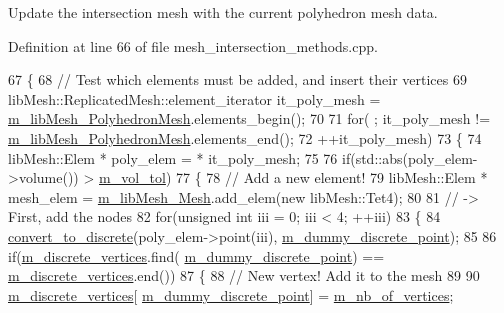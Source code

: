 Update the intersection mesh with the current polyhedron mesh data. 



Definition at line 66 of file mesh\+\_\+intersection\+\_\+methods.\+cpp.


\begin{DoxyCode}
67 \{
68     \textcolor{comment}{// Test which elements must be added, and insert their vertices}
69     libMesh::ReplicatedMesh::element\_iterator   it\_poly\_mesh = 
      \hyperlink{classcarl_1_1_mesh___intersection_a4377fd67cf7c486ba4263fe11b99a3cf}{m\_libMesh\_PolyhedronMesh}.elements\_begin();
70 
71     \textcolor{keywordflow}{for}(    ; it\_poly\_mesh != \hyperlink{classcarl_1_1_mesh___intersection_a4377fd67cf7c486ba4263fe11b99a3cf}{m\_libMesh\_PolyhedronMesh}.elements\_end();
72             ++it\_poly\_mesh)
73     \{
74         libMesh::Elem * poly\_elem = * it\_poly\_mesh;
75 
76         \textcolor{keywordflow}{if}(std::abs(poly\_elem->volume()) > \hyperlink{classcarl_1_1_mesh___intersection_ad282e724c75087a90026854992ec0809}{m\_vol\_tol})
77         \{
78             \textcolor{comment}{// Add a new element!}
79             libMesh::Elem * mesh\_elem = \hyperlink{classcarl_1_1_mesh___intersection_aeea7835637a936ca4f272e48cea18fa2}{m\_libMesh\_Mesh}.add\_elem(\textcolor{keyword}{new} libMesh::Tet4);
80             
81             \textcolor{comment}{// -> First, add the nodes}
82             \textcolor{keywordflow}{for}(\textcolor{keywordtype}{unsigned} \textcolor{keywordtype}{int} iii = 0; iii < 4; ++iii)
83             \{
84                 \hyperlink{classcarl_1_1_mesh___intersection_a9295162aa24e62dae37d3dd12c46f0d1}{convert\_to\_discrete}(poly\_elem->point(iii),
      \hyperlink{classcarl_1_1_mesh___intersection_aa84e7b362c2187f100591e5e3fef33e5}{m\_dummy\_discrete\_point});
85 
86                 \textcolor{keywordflow}{if}(\hyperlink{classcarl_1_1_mesh___intersection_a5c5abcce2f778e50c5c8a5265692c96f}{m\_discrete\_vertices}.find(
      \hyperlink{classcarl_1_1_mesh___intersection_aa84e7b362c2187f100591e5e3fef33e5}{m\_dummy\_discrete\_point}) == \hyperlink{classcarl_1_1_mesh___intersection_a5c5abcce2f778e50c5c8a5265692c96f}{m\_discrete\_vertices}.end())
87                 \{
88                     \textcolor{comment}{// New vertex! Add it to the mesh}
89 
90                     \hyperlink{classcarl_1_1_mesh___intersection_a5c5abcce2f778e50c5c8a5265692c96f}{m\_discrete\_vertices}[
      \hyperlink{classcarl_1_1_mesh___intersection_aa84e7b362c2187f100591e5e3fef33e5}{m\_dummy\_discrete\_point}] = \hyperlink{classcarl_1_1_mesh___intersection_ac2765c9bdf5f15878a1cff52db5551aa}{m\_nb\_of\_vertices};

\end{DoxyCode}
